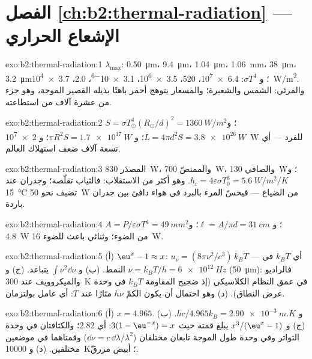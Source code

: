 \section*{الفصل \ref{ch:b2:thermal-radiation} --- الإشعاع الحراري}

\begin{solution}{exo:b2:thermal-radiation:1}
$\lambda_{\max}$: \qty{0.50}{\micro m}، \qty{9.4}{\micro m}، \qty{1.04}{\micro m}،
\qty{1.06}{mm}، \qty{38}{\micro m}، \qty{3.2}{\micro m}؛ و $\sigma T^4$: \qty{6.4e7}{}،
\qty{520}{}، \qty{3.5e6}{}، \qty{3.1e-6}{}، \qty{2.0}{}، \qty{3.7e4}{W/m^2}. والمرئي:
الشمس والشعيرة؛ والمسعار يتوهج أحمر باهتًا بذيله القصير
الموجة، وهو جزء من عشرة آلاف من استطاعته.
\end{solution}

\begin{solution}{exo:b2:thermal-radiation:2}
$S = \sigma T_\odot^4(R_\odot/d)^2 = \qty{1360}{W/m^2}$؛ و $L = 4\pi d^2S =
\qty{3.8e26}{W}$؛ و $\pi R^2S = \qty{1.7e17}{W}$؛ و \qty{2e7}{W} للفرد --- أي تسعة
آلاف ضعف استهلاك العالم.
\end{solution}

\begin{solution}{exo:b2:thermal-radiation:3}
المصدَر \qty{830}{W}، والممتصّ \qty{700}{W}، والصافي \qty{130}{W}؛ و $h_{\text{r}} =
4\varepsilon\sigma T_0^3 = \qty{5.6}{W/m^2/K}$. وهو أكثر من الاستقلاب:
فالثياب تقلّصه؛ وجدران عند \qty{15}{\celsius} تضيف نحو \qty{50}{W} من الضياع
--- فيحسّ المرء بالبرد في هواء دافئ بين جدران باردة.
\end{solution}

\begin{solution}{exo:b2:thermal-radiation:4}
$A = P/\varepsilon\sigma T^4 = \qty{49}{mm^2}$؛ و $\ell = A/\pi d = \qty{31}{cm}$؛
و \qty{4.8}{W} من الضوء؛ وثنائي باعث للضوء \qty{16}{W}.
\end{solution}

\begin{solution}{exo:b2:thermal-radiation:5}
(أ) $\eu^x - 1 \approx x$: $u_\nu = (8\pi\nu^2/c^3)\,k_BT$ --- أي $k_BT$ في النمط.
(ب) و $\int\nu^2\dd\nu$ يتباعد. (ج) و $\nu = k_BT/h = \qty{6e12}{Hz}$ (\qty{50}{\micro m}):
فالراديو والميكروويف عند \qty{300}{K} في عمق النظام الكلاسيكي (إذ
ضجيج المقاومة $k_BT$ في وحدة عرض النطاق). (د) وهو احتمال
أن يكون الكمّ $h\nu$ مثارًا عند $T$: أي عامل بولتزمان.
\end{solution}

\begin{solution}{exo:b2:thermal-radiation:6}
(أ) $x = 4.965$. (ب) و $hc/4.965k_B = \qty{2.90e-3}{m.K}$. (ج) و $x^3/(\eu^x - 1)$
يبلغ قمته حيث $3(1 - \eu^{-x}) = x$: أي $2.82$؛ والكثافتان في وحدة التواتر
وفي وحدة طول الموجة تابعان مختلفان ($\dd\nu = c\,\dd\lambda/\lambda^2$)
وقمتاهما في موضعين مختلفين. (د) و \qty{10000}{K}؛ أبيض مزرقّ.
\end{solution}

